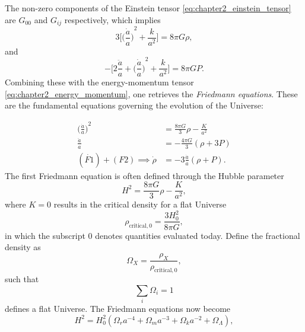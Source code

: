 The non-zero components of the Einstein tensor \cref{eq:chapter2_einstein_tensor} are \(G_{00}\) and \(G_{i j}\) respectively, which implies
%
\begin{equation}
	3\Bigg[ {\bigg(\frac{\dot{a}}{a}\bigg)}^{2} + \frac{k}{a^{2}} \Bigg]
	= 8\pi G\rho,
\end{equation}
%
and
%
\begin{equation}
	-\Bigg[ 2\frac{\ddot{a}}{a} + {\bigg(\frac{\dot{a}}{a}\bigg)}^{2} + \frac{k}{a^{2}} \Bigg]
	= 8\pi G P.
\end{equation}
%
Combining these with the energy-momentum tensor \cref{eq:chapter2_energy_momentum}, one retrieves the \emph{Friedmann equations}.
These are the fundamental equations governing the evolution of the Universe:
%
\addtocounter{equation}{-1}
%
\begin{subequations}
	\begin{align}
		{\bigg(\frac{\dot{a}}{a}\bigg)}^{2}   & = \frac{8\pi G}{3} \rho - \frac{K}{a^{2}} \tag{F1} \label{eq:chapter2_f1} \\
		\frac{\ddot{a}}{a}                    & = -\frac{4\pi G}{3}(\rho + 3P) \tag{F2} \label{eq:chapter2_f2}            \\
		(\dot{F1}) + (F2) \implies \dot{\rho} & = -3\frac{\dot{a}}{a}(\rho + P). \tag{F3}
	\end{align}
\end{subequations}
%
The first Friedmann equation is often defined through the Hubble parameter
%
\begin{equation}
	H^{2}
	= \frac{8\pi G}{3} \rho - \frac{K}{a^{2}},
\end{equation}
%
where \(K=0\) results in the critical density for a flat Universe
%
\begin{equation}
	\rho_{\text{critical},0}
	= \frac{3H_{0}^{2}}{8\pi G},
\end{equation}
%
in which the subscript \(0\) denotes quantities evaluated today.
Define the fractional density as
%
\begin{equation}
	\Omega_{X}
	= \frac{\rho_{X}}{\rho_{\text{critical},0}},
\end{equation}
%
such that
%
\begin{equation}
	\sum\limits_{i}\Omega_{i}
	= 1
\end{equation}
%
defines a flat Universe.
The Friedmann equations now become
%
\begin{equation}
	H^{2}
	= H_{0}^{2} (\Omega_{r}a^{-4} + \Omega_{m}a^{-3} + \Omega_{k}a^{-2} + \Omega_{\Lambda}),
\end{equation}
